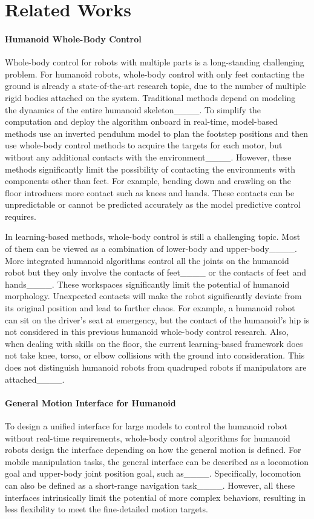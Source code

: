 \section{Related Works}
\paragraph{Humanoid Whole-Body Control}
Whole-body control for robots with multiple parts is a long-standing challenging problem. For humanoid robots, whole-body control with only feet contacting the ground is already a state-of-the-art research topic, due to the number of multiple rigid bodies attached on the system. Traditional methods depend on modeling the dynamics of the entire humanoid skeleton____. To simplify the computation and deploy the algorithm onboard in real-time, model-based methods use an inverted pendulum model to plan the footstep positions and then use whole-body control methods to acquire the targets for each motor, but without any additional contacts with the environment____. However, these methods significantly limit the possibility of contacting the environments with components other than feet. For example, bending down and crawling on the floor introduces more contact such as knees and hands. These contacts can be unpredictable or cannot be predicted accurately as the model predictive control requires.

In learning-based methods, whole-body control is still a challenging topic. Most of them can be viewed as a combination of lower-body and upper-body____. More integrated humanoid algorithms control all the joints on the humanoid robot but they only involve the contacts of feet____ or the contacts of feet and hands____. These workspaces significantly limit the potential of humanoid morphology. Unexpected contacts will make the robot significantly deviate from its original position and lead to further chaos. For example, a humanoid robot can sit on the driver's seat at emergency, but the contact of the humanoid's hip is not considered in this previous humanoid whole-body control research. Also, when dealing with skills on the floor, the current learning-based framework does not take knee, torso, or elbow collisions with the ground into consideration. This does not distinguish humanoid robots from quadruped robots if manipulators are attached____.

\paragraph{General Motion Interface for Humanoid}
To design a unified interface for large models to control the humanoid robot without real-time requirements, whole-body control algorithms for humanoid robots design the interface depending on how the general motion is defined. For mobile manipulation tasks, the general interface can be described as a locomotion goal and upper-body joint position goal, such as____. Specifically, locomotion can also be defined as a short-range navigation task____. However, all these interfaces intrinsically limit the potential of more complex behaviors, resulting in less flexibility to meet the fine-detailed motion targets.

